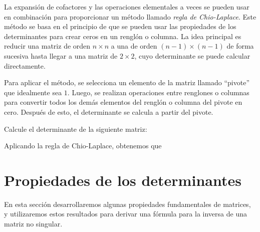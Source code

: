 La expansión de cofactores y las operaciones elementales a veces se pueden usar en combinación para proporcionar un método llamado \emph{regla de Chio-Laplace}. Este método se basa en el principio de que se pueden usar las propiedades de los determinantes para crear ceros en un renglón o columna. La idea principal es reducir una matriz de orden $n \times n$ a una de orden $(n - 1) \times (n - 1)$ de forma sucesiva hasta llegar a una matriz de $2 \times 2$, cuyo determinante se puede calcular directamente.

Para aplicar el método, se selecciona un elemento de la matriz llamado “pivote” que idealmente sea $1$. Luego, se realizan operaciones entre renglones o columnas para convertir todos los demás elementos del renglón o columna del pivote en cero. Después de esto, el determinante se calcula a partir del pivote.

\newpage

\begin{examplebox}{}{}
    Calcule el determinante de la siguiente matriz:
    \begin{matrizn}
    \end{matrizn}

    \tcblower
    \solucion Aplicando la regla de Chio-Laplace, obtenemos que
    \begin{matrizn}
    \end{matrizn}
\end{examplebox}

\section{Propiedades de los determinantes}

En esta sección desarrollaremos algunas propiedades fundamentales de matrices, y utilizaremos estos resultados para derivar una fórmula para la inversa de una matriz no singular.

